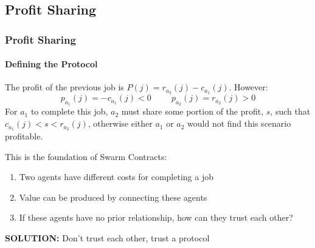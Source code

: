 \documentclass[
	10pt, %
	aspectratio=169, %
]{beamer}
\begin{document}
\subsection{Profit Sharing}
\begin{frame}
	\frametitle{Profit Sharing}
	\framesubtitle{Defining the Protocol}

	The profit of the previous job is $P(j) = r_{a_2}(j) - c_{a_1}(j)$. However: $$ p_{a_1}(j) = -c_{a_1}(j) < 0 \hspace{1cm} p_{a_2}(j) = r_{a_2}(j) > 0 $$
	For $a_1$ to complete this job, $a_2$ must share some portion of the profit, $s$, such that $c_{a_1}(j) < s < r_{a_2}(j)$, otherwise either $a_1$ or $a_2$ would not find this scenario profitable.

	\medskip

	This is the foundation of Swarm Contracts:
	\begin{enumerate}
		\item Two agents have different costs for completing a job
		\item Value can be produced by connecting these agents
		\item If these agents have no prior relationship, how can they trust each other?
	\end{enumerate}
	\begin{center}
		\textbf{SOLUTION:} Don't trust each other, trust a protocol
	\end{center}
\end{frame}
\end{document}
